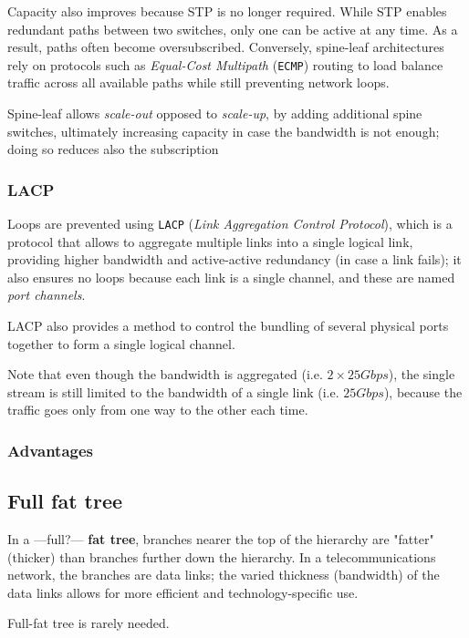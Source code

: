 Capacity also improves because STP is no longer required. While STP enables redundant paths between two switches, only one can be active at any time. As a result, paths often become oversubscribed. 
Conversely, spine-leaf architectures rely on protocols such as \textit{Equal-Cost Multipath} (\texttt{ECMP}) routing to load balance traffic across all available paths while still preventing network loops.

Spine-leaf allows \textit{scale-out} opposed to \textit{scale-up}, by adding additional spine switches, ultimately increasing capacity in case the bandwidth is not enough; doing so reduces also the subscription

\subsubsection{LACP}
Loops are prevented using \texttt{LACP} (\textit{Link Aggregation Control Protocol}), which is a protocol that allows to aggregate multiple links into a single logical link, providing higher bandwidth and active-active redundancy (in case a link fails);
it also ensures no loops because each link is a single channel, and these are named \textit{port channels}.

LACP also provides a method to control the bundling of several physical ports together to form a single logical channel.

Note that even though the bandwidth is aggregated (i.e. $2\times 25Gbps$), the single stream is still limited to the bandwidth of a single link (i.e. $25Gbps$), because the traffic goes only from one way to the other each time.

\subsubsection{Advantages}


\subsection{Full fat tree}
In a ---full?--- \textbf{fat tree}, branches nearer the top of the hierarchy are "fatter" (thicker) than branches further down the hierarchy. In a telecommunications network, the branches are data links; the varied thickness (bandwidth) of the data links allows for more efficient and technology-specific use.

Full-fat tree is rarely needed.

